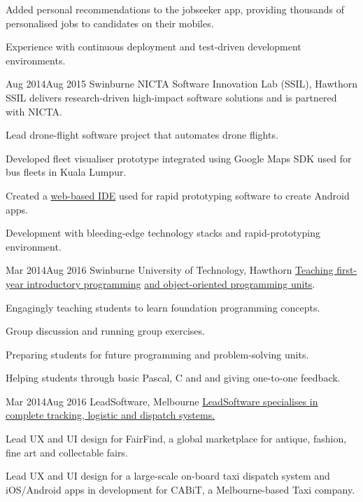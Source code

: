{{          \item Added personal recommendations to the jobseeker app, providing thousands of personalised jobs to candidates on their mobiles.
          \item Experience with continuous deployment and test-driven development environments.
        }
    \clearpage
        {Aug 2014}{Aug 2015}
        {Swinburne NICTA Software Innovation Lab (SSIL), Hawthorn}
        {SSIL delivers research-driven high-impact software solutions and is partnered with NICTA.}
        {
          \item Lead drone-flight software project that automates drone flights.
          \item Developed fleet visualiser prototype integrated using Google Maps SDK used for bus fleets in Kuala Lumpur.
          \item Created a \href{http://rappt.io/}{web-based IDE} used for rapid prototyping software to create Android apps.
          \item Development with bleeding-edge technology stacks and rapid-prototyping environment.
        }
        {Mar 2014}{Aug 2016}
        {Swinburne University of Technology, Hawthorn}
        {\href{http://www.swinburne.edu.au/study/courses/units/Introduction-to-Programming-COS10009/local}{Teaching first-year introductory programming} \href{http://www.swinburne.edu.au/study/courses/units/Object-Oriented-Programming-COS70006/local}{and object-oriented programming units}.}
        {
          \item Engagingly teaching students to learn foundation programming concepts.
          \item Group discussion and running group exercises.
          \item Preparing students for future programming and problem-solving units.
          \item Helping students through basic Pascal, C and \Csh\hspace{0.25ex}and giving one-to-one feedback.
        }
        {Mar 2014}{Aug 2016}
        {LeadSoftware, Melbourne}
        {\href{http://www.leadsoftware.com.au/}{LeadSoftware specialises in complete tracking, logistic and dispatch systems.}}
        {
          \item Lead UX and UI design for FairFind, a global marketplace for antique, fashion, fine art and collectable fairs.
          \item Lead UX and UI design for a large-scale on-board taxi dispatch system and iOS/Android apps in development for CABiT, a Melbourne-based Taxi company.
}}
